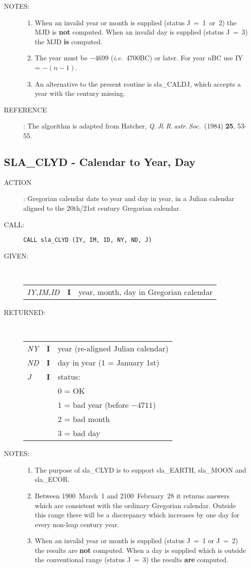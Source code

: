 \documentclass[11pt,twoside]{article}
\newcommand{\xlabel}[1]{}
\newcommand{\routine}[3]
{\hbadness=10000
  \vbox
  {
    \rule{\textwidth}{0.3mm}\\
    {\Large {\bf #1} \hfill #2 \hfill {\bf #1}}\\
    \setlength{\oldspacing}{\topsep}
    \setlength{\topsep}{0.3ex}
    \begin{description}
      #3
    \end{description}
    \setlength{\topsep}{\oldspacing}
  }
}
\renewcommand{\routine}[3]
   {
      \subsection{#1\xlabel{#1} - #2\label{#1}}
       \begin{description}
         #3
       \end{description}
   }
\newcommand{\action}[1]
{\item[ACTION]: #1}
\newcommand{\action}[1]
   {\item[ACTION:] #1}
\newcommand{\call}[1]
{\item[CALL]: \hspace{0.4em}{\tt #1}}
\newlength{\oldspacing}
\renewcommand{\call}[1]
   {
    \item[CALL:] {\tt #1}
   }
\newcommand{\args}[2]
{
  \goodbreak
  \setlength{\oldspacing}{\topsep}
  \setlength{\topsep}{0.3ex}
  \begin{description}
  \item[#1]:\\[1.5ex]
    \begin{tabular}{p{7em}p{6em}p{22em}}
      #2
    \end{tabular}
  \end{description}
  \setlength{\topsep}{\oldspacing}
}
\renewcommand{\args}[2]
   {
     \begin{description}
        \item[#1:]\\
        \begin{tabular}{p{7em}p{6em}l}
           #2
        \end{tabular}
     \end{description}
   }
\newcommand{\spec}[3]
{
  {\em {#1}} & {\bf \mbox{#2}} & {#3}
}
\newcommand{\notes}[1]
{
  \goodbreak
  \setlength{\oldspacing}{\topsep}
  \setlength{\topsep}{0.3ex}
  \begin{description}
    \item[NOTES]:
        #1
  \end{description}
  \setlength{\topsep}{\oldspacing}
}
\renewcommand{\notes}[1]
   {
      \begin{description}
         \item[NOTES:]
            #1
      \end{description}
   }
\newcommand{\aref}[1]
{
  \goodbreak
  \setlength{\oldspacing}{\topsep}
  \setlength{\topsep}{0.3ex}
  \begin{description}
    \item[REFERENCE]:
        #1
  \end{description}
  \setlength{\topsep}{\oldspacing}
}
\newcommand{\aref}[1]
   {
     \begin{description}
       \item[REFERENCE:]
           #1
     \end{description}
   }
\begin{document}
\notes
{
 \begin{enumerate}
  \item When an invalid year or month is supplied (status J~=~1~or~2)
        the MJD is {\bf not} computed.  When an invalid day is supplied
        (status J~=~3) the MJD {\bf is} computed.
  \item The year must be $-$4699 ({\it i.e.}\ 4700BC) or later.
        For year $n$BC use IY = $-(n-1)$.
  \item An alternative to the present routine is sla\_CALDJ, which
        accepts a year with the century missing.
 \end{enumerate}
}
\aref{The algorithm is adapted from Hatcher,
      {\it Q.\,Jl.\,R.\,astr.\,Soc.}\ (1984) {\bf 25}, 53-55.}
\routine{SLA\_CLYD}{Calendar to Year, Day}
{
 \action{Gregorian calendar date to year and day in year, in a Julian
         calendar aligned to the 20th/21st century Gregorian calendar.}
 \call{CALL sla\_CLYD (IY, IM, ID, NY, ND, J)}
}
\args{GIVEN}
{
 \spec{IY,IM,ID}{I}{year, month, day in Gregorian calendar}
}
\args{RETURNED}
{
 \spec{NY}{I}{year (re-aligned Julian calendar)} \\
 \spec{ND}{I}{day in year (1 = January 1st)} \\
 \spec{J}{I}{status:} \\
 \spec{}{}{\hspace{1.5em}  0 = OK} \\
 \spec{}{}{\hspace{1.5em}  1 = bad year (before $-4711$)} \\
 \spec{}{}{\hspace{1.5em}  2 = bad month} \\
 \spec{}{}{\hspace{1.5em}  3 = bad day}
}
\notes
{
 \begin{enumerate}
  \item The purpose of sla\_CLYD is to support sla\_EARTH,
        sla\_MOON and sla\_ECOR.
  \item Between 1900~March~1 and 2100~February~28 it returns answers
        which are consistent with the ordinary Gregorian calendar.
        Outside this range there will be a discrepancy which increases
        by one day for every non-leap century year.
  \item When an invalid year or month is supplied (status J~=~1 or J~=~2)
        the results are {\bf not} computed.  When a day is
        supplied which is outside the conventional range (status J~=~3)
        the results {\bf are} computed.
 \end{enumerate}
}
\end{document}
